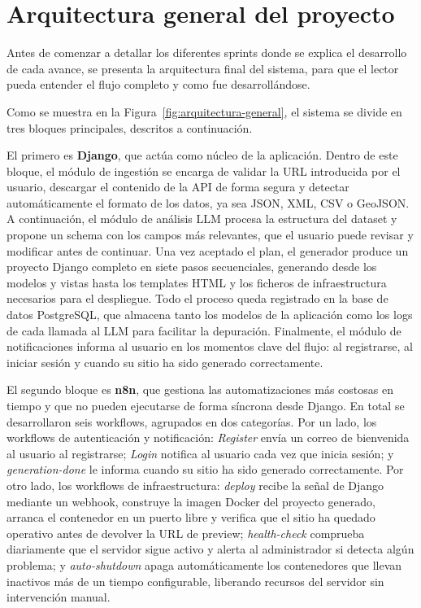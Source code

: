 \section{Arquitectura general del proyecto}
\label{sec:Arquitectura-general}

Antes de comenzar a detallar los diferentes sprints donde se explica el desarrollo de cada avance, se presenta la arquitectura final del sistema, para que el lector pueda entender el flujo completo y como fue desarrollándose.

Como se muestra en la Figura~\ref{fig:arquitectura-general}, el sistema se divide en tres bloques principales, descritos a continuación.


El primero es \textbf{Django}, que actúa como núcleo de la aplicación. Dentro de este bloque, el módulo de ingestión se encarga de validar la URL introducida por el usuario, descargar el contenido de la API de forma segura y detectar automáticamente el formato de los datos, ya sea JSON, XML, CSV o GeoJSON. A continuación, el módulo de análisis LLM procesa la estructura del dataset y propone un schema con los campos más relevantes, que el usuario puede revisar y modificar antes de continuar. Una vez aceptado el plan, el generador produce un proyecto Django completo en siete pasos secuenciales, generando desde los modelos y vistas hasta los templates HTML y los ficheros de infraestructura necesarios para el despliegue. Todo el proceso queda registrado en la base de datos PostgreSQL, que almacena tanto los modelos de la aplicación como los logs de cada llamada al LLM para facilitar la depuración. Finalmente, el módulo de notificaciones informa al usuario en los momentos clave del flujo: al registrarse, al iniciar sesión y cuando su sitio ha sido generado correctamente.

El segundo bloque es \textbf{n8n}, que gestiona las automatizaciones más costosas en tiempo y que no pueden ejecutarse de forma síncrona desde Django. 
En total se desarrollaron seis workflows, agrupados en dos categorías. 
Por un lado, los workflows de autenticación y notificación: 
\textit{Register} envía un correo de bienvenida al usuario al registrarse; 
\textit{Login} notifica al usuario cada vez que inicia sesión; y 
\textit{generation-done} le informa cuando su sitio ha sido generado 
correctamente. 
Por otro lado, los workflows de infraestructura: 
\textit{deploy} recibe la señal de Django mediante un webhook, construye 
la imagen Docker del proyecto generado, arranca el contenedor en un puerto 
libre y verifica que el sitio ha quedado operativo antes de devolver la URL 
de preview; \textit{health-check} comprueba diariamente que el servidor 
sigue activo y alerta al administrador si detecta algún problema; y 
\textit{auto-shutdown} apaga automáticamente los contenedores que llevan 
inactivos más de un tiempo configurable, liberando recursos del servidor 
sin intervención manual.

